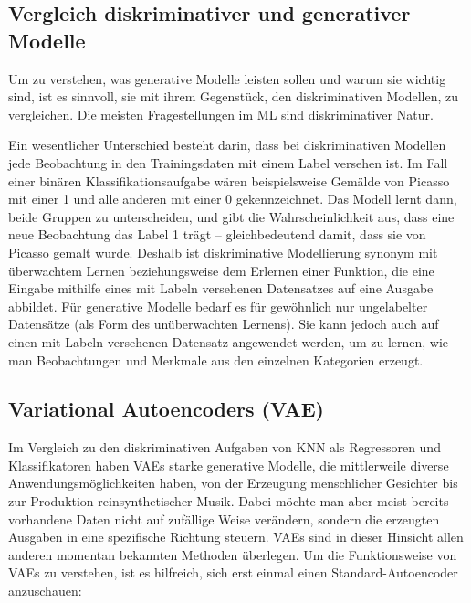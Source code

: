 \subsection{Vergleich diskriminativer und generativer Modelle}\label{Vergleich diskriminativer und generativer Modelle}
Um zu verstehen, was generative Modelle leisten sollen und warum sie wichtig sind, ist es sinnvoll, sie mit ihrem Gegenstück, den diskriminativen Modellen, zu vergleichen. Die meisten Fragestellungen im ML sind diskriminativer Natur.

Ein wesentlicher Unterschied besteht darin, dass bei diskriminativen Modellen jede Beobachtung in den Trainingsdaten mit einem Label versehen ist. Im Fall einer binären Klassifikationsaufgabe wären beispielsweise Gemälde von Picasso mit einer 1 und alle anderen mit einer 0 gekennzeichnet. Das Modell lernt dann, beide Gruppen zu unterscheiden, und gibt die Wahrscheinlichkeit aus, dass eine neue Beobachtung das Label 1 trägt – gleichbedeutend damit, dass sie von Picasso gemalt wurde.\cite{fos19}
Deshalb ist diskriminative Modellierung synonym mit überwachtem Lernen beziehungsweise dem Erlernen einer Funktion, die eine Eingabe mithilfe eines mit Labeln versehenen Datensatzes auf eine Ausgabe abbildet.
Für generative Modelle bedarf es für gewöhnlich nur ungelabelter Datensätze (als Form des unüberwachten Lernens). Sie kann jedoch auch auf einen mit Labeln versehenen Datensatz angewendet werden, um zu lernen, wie man Beobachtungen und Merkmale aus den einzelnen Kategorien erzeugt.

\subsection{Variational Autoencoders (VAE)}\label{Variational Autoencoders (VAE)}
Im Vergleich zu den diskriminativen Aufgaben von KNN als Regressoren und Klassifikatoren haben VAEs starke generative Modelle, die mittlerweile diverse Anwendungsmöglichkeiten haben, von der Erzeugung menschlicher Gesichter bis zur Produktion reinsynthetischer Musik. Dabei möchte man aber meist bereits vorhandene Daten nicht auf zufällige Weise verändern, sondern die erzeugten Ausgaben in eine spezifische Richtung steuern. VAEs sind in dieser Hinsicht allen anderen momentan bekannten Methoden überlegen. Um die Funktionsweise von VAEs zu verstehen, ist es hilfreich, sich erst einmal einen Standard-Autoencoder anzuschauen:

